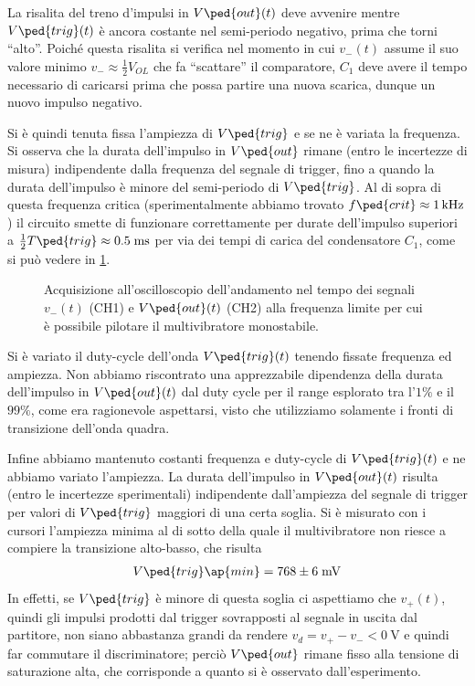 \documentclass[10pt, a4paper, italian]{article}
\begin{document}
La risalita del treno d'impulsi in $V\ped{out} (t)$ deve avvenire mentre
$V\ped{trig} (t)$ è ancora costante nel semi-periodo negativo, prima che torni
``alto''. Poiché questa risalita si verifica nel momento in cui $v_- (t)$
assume il suo valore minimo $v_- \approx \frac{1}{2} V_{OL}$ che fa
``scattare'' il comparatore, $C_1$ deve avere il tempo necessario di caricarsi
prima che possa partire una nuova scarica, dunque un nuovo impulso negativo.

Si è quindi tenuta fissa l'ampiezza di $V\ped{trig}$ e se ne è variata la
frequenza. Si osserva che la durata dell'impulso in $V\ped{out}$ rimane
(entro le incertezze di misura) indipendente dalla frequenza del segnale di
trigger, fino a quando la durata dell'impulso è minore del semi-periodo di
$V\ped{trig}$. Al di sopra di questa frequenza critica (sperimentalmente
abbiamo trovato $f\ped{crit} \approx \SI{1}{k\hertz}$) il circuito smette di
funzionare correttamente per durate dell'impulso superiori a
$\frac{1}{2} T\ped{trig} \approx 0.5 \; \si{m\s}$ per via dei tempi di carica
del condensatore $C_1$, come si può vedere in \cref{fig: mstabileflim}.
\begin{figure}[htbp]
	\centering
	\caption{Acquisizione all'oscilloscopio dell'andamento nel tempo dei
	segnali $v_- (t)$ (CH1) e $V\ped{out} (t)$ (CH2) alla frequenza limite
	per cui è possibile pilotare il multivibratore monostabile.
	\label{fig: mstabileflim}}
\end{figure}

Si è variato il duty-cycle dell'onda $V\ped{trig} (t)$ tenendo fissate
frequenza ed ampiezza. Non abbiamo riscontrato una apprezzabile dipendenza
della durata dell'impulso in $V\ped{out} (t)$ dal duty cycle per il range
esplorato tra l'$1 \%$ e il $99 \%$, come era ragionevole aspettarsi, visto che
utilizziamo solamente i fronti di transizione dell'onda quadra.

Infine abbiamo mantenuto costanti frequenza e duty-cycle di $V\ped{trig} (t)$
e ne abbiamo variato l'ampiezza. La durata dell'impulso in $V\ped{out} (t)$
risulta (entro le incertezze sperimentali) indipendente dall'ampiezza del
segnale di trigger per valori di $V\ped{trig}$ maggiori di una certa soglia.
Si è misurato con i cursori l'ampiezza minima al di sotto della quale
il multivibratore non riesce a compiere la transizione alto-basso,
che risulta
\begin{align*}
V\ped{trig}\ap{min} = 768 \pm 6 \; \si{m\V}
\end{align*}
In effetti, se $V\ped{trig}$ è minore di questa soglia ci aspettiamo
che $v_+ (t)$, quindi gli impulsi prodotti dal trigger sovrapposti al segnale
in uscita dal partitore, non siano abbastanza grandi da rendere
$v_d = v_+ - v_- < \SI{0}{\V}$ e quindi far commutare il discriminatore; perciò
$V\ped{out}$ rimane fisso alla tensione di saturazione alta, che
corrisponde a quanto si è osservato dall'esperimento.
\end{document}
